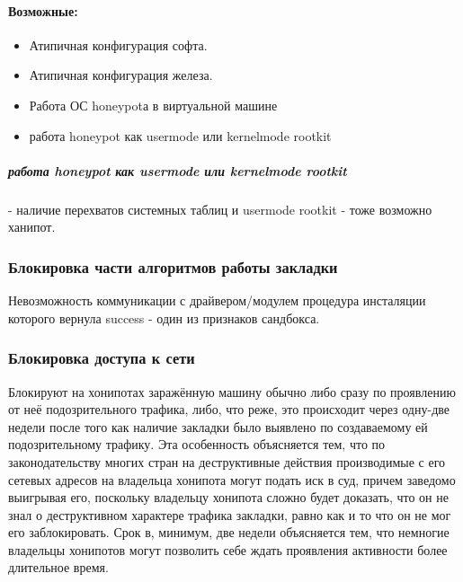 \paragraph{Возможные:\\}

\begin{itemize}
\item{Атипичная конфигурация софта.}
\item{Атипичная конфигурация железа.}
\item{Работа ОС honeypotа в виртуальной машине}
\item{работа honeypot как usermode или kernelmode rootkit}
\end{itemize}

\subparagraph{работа honeypot как usermode или kernelmode rootkit} - наличие перехватов системных таблиц и usermode rootkit - тоже возможно ханипот.


\subsubsection{Блокировка части алгоритмов работы закладки}

Невозможность коммуникации с драйвером/модулем процедура инсталяции которого вернула success - один из признаков сандбокса.


\subsubsection{Блокировка доступа к сети}

Блокируют на хонипотах заражённую машину обычно либо сразу по проявлению
от неё подозрительного трафика,  либо, что реже, это  происходит через
одну-две недели после того как наличие закладки было выявлено по
создаваемому ей подозрительному трафику. Эта особенность объясняется
тем,  что по законодательству многих стран на деструктивные действия
производимые с его сетевых адресов на  владельца хонипота могут подать
иск в суд, причем заведомо выигрывая его, поскольку владельцу хонипота
сложно будет доказать, что он не знал о деструктивном характере трафика
закладки, равно как и то что он  не мог его заблокировать. Срок в,
минимум, две недели объясняется тем, что  немногие владельцы хонипотов
могут позволить себе ждать проявления активности более длительное время.

